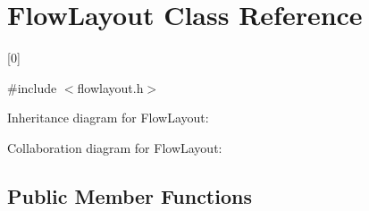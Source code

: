 \hypertarget{class_flow_layout}{}\section{Flow\+Layout Class Reference}
\label{class_flow_layout}


\mbox{[}0\mbox{]}  




{\ttfamily \#include $<$flowlayout.\+h$>$}



Inheritance diagram for Flow\+Layout\+:


Collaboration diagram for Flow\+Layout\+:
\subsection*{Public Member Functions}
